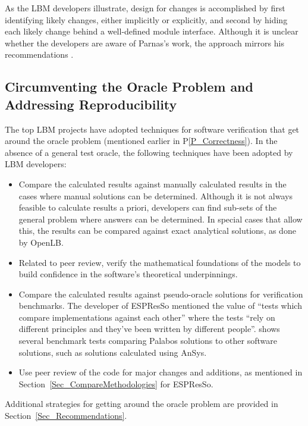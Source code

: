 \documentclass[final, 3p, times, authoryear]{elsarticle}
\newcommand{\ppref}[1]{P\ref{#1}}
\begin{document}
As the LBM developers illustrate, design for changes is accomplished by first
identifying likely changes, either implicitly or explicitly, and second by
hiding each likely change behind a well-defined module interface.  Although it
is unclear whether the developers are aware of Parnas's work, the approach
mirrors his recommendations \citep{Parnas1972a}.

\subsection{Circumventing the Oracle Problem and Addressing Reproducibility}
\label{SecReproducibility}

The top LBM projects have adopted techniques for software verification that get
around the oracle problem (mentioned earlier in \ppref{P_Correctness}). In the
absence of a general test oracle, the following techniques have been adopted by
LBM developers:

\begin{itemize}
	\item Compare the calculated results against manually calculated results in
	the cases where manual solutions can be determined.  Although it is not
	always feasible to calculate results a priori, developers can find sub-sets
	of the general problem where answers can be determined.  In special cases
	that allow this, the results can be compared against exact analytical
	solutions, as done by OpenLB.
	\item Related to peer review, verify the mathematical foundations of the
	models to build confidence in the software's theoretical underpinnings.
	\item Compare the calculated results against pseudo-oracle solutions for
	verification benchmarks. The developer of ESPResSo mentioned the value of
	``tests which compare implementations against each other'' where the tests
	``rely on different principles and they've been written by different
	people''. \citet{latt2021palabos} shows several benchmark tests comparing
	Palabos solutions to other software solutions, such as solutions calculated
	using AnSys.
	\item Use peer review of the code for major changes and additions, as
	mentioned in Section~\ref{Sec_CompareMethodologies} for ESPResSo. 
\end{itemize}

\noindent Additional strategies for getting around the oracle problem are
provided in Section~\ref{Sec_Recommendations}.
\end{document}
